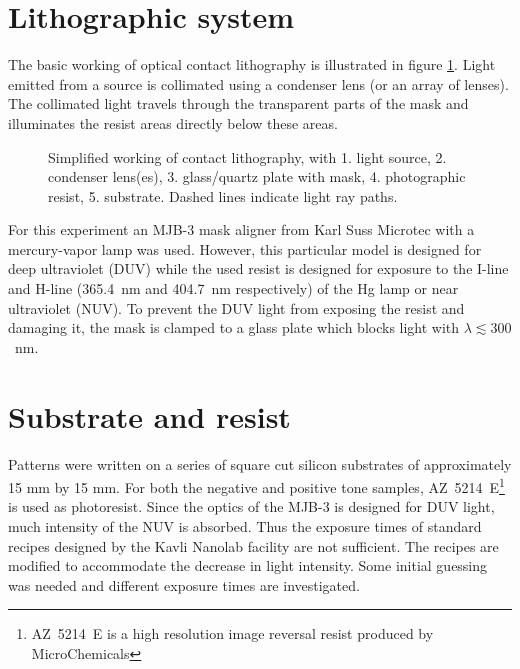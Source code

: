 \section*{Lithographic system}
The basic working of optical contact lithography is illustrated in figure \ref{fig:contact-litho}. Light emitted from a source is collimated using a condenser lens (or an array of lenses). The collimated light travels through the transparent parts of the mask and illuminates the resist areas directly below these areas. 
\begin{figure}[H]
	\centering
	\resizebox{0.7\linewidth}{!}{}
	\caption{Simplified working of contact lithography, with 1. light source, 2. condenser lens(es), 3. glass/quartz plate with mask, 4. photographic resist, 5. substrate. Dashed lines indicate light ray paths.}
	\label{fig:contact-litho}
\end{figure} For this experiment an MJB-3 mask aligner from Karl Suss Microtec with a mercury-vapor lamp was used. However, this particular model is designed for deep ultraviolet (DUV) while the used resist is designed for exposure to the I-line and H-line (365.4~nm and 404.7~nm respectively) of the Hg lamp or near ultraviolet (NUV). To prevent the DUV light from exposing the resist and damaging it, the mask is clamped to a glass plate which blocks light with $\lambda \lesssim 300$~nm.


\section*{Substrate and resist}
Patterns were written on a series of square cut silicon substrates of approximately 15 mm by 15 mm. For both the negative and positive tone samples, AZ~5214~E\footnote{AZ~5214~E is a high resolution image reversal resist produced by MicroChemicals} is used as photoresist. Since the optics of the MJB-3 is designed for DUV light, much intensity of the NUV is absorbed. Thus the exposure times of standard recipes designed by the Kavli Nanolab facility are not sufficient. The recipes are modified to accommodate the decrease in light intensity. Some initial guessing was needed and different exposure times are  investigated.

